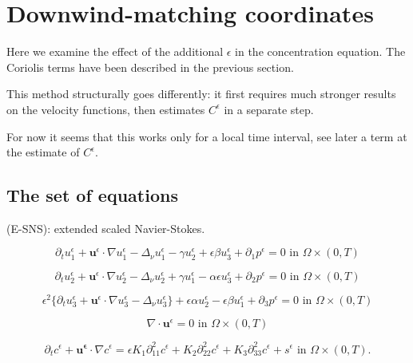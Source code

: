 \documentclass[11pt]{article}
\begin{document}
\section{Downwind-matching coordinates}

Here we examine the effect of the additional $\epsilon$ in the concentration equation. The Coriolis terms have been described in the previous section.

This method structurally goes differently: it first requires much stronger results on the velocity functions, then estimates $C^\epsilon$ in a separate step.

For now it seems that this works only for a local time interval, see later a term at the estimate of $C^\epsilon.$

  \subsection{The set of equations}

(E-SNS): extended scaled Navier-Stokes.

    \begin{equation} \label{ANSC1-dw}
    \partial_t u^\epsilon _1 + \mathbf{u}^\epsilon \cdot \nabla u^\epsilon _1 -\Delta_\nu u^\epsilon _1 -\gamma u_2^\epsilon + \epsilon \beta u_3^\epsilon + \partial_1 p^\epsilon = 0 \text{ in } \Omega \times (0,T)
    \end{equation}
    
    \begin{equation} \label{ANSC2-dw}
    \partial_t u_2^\epsilon + \mathbf{u}^\epsilon \cdot \nabla u_2^\epsilon -\Delta_\nu u_2^\epsilon + \gamma u_1^\epsilon  - \alpha \epsilon u^\epsilon_3 + \partial_2 p^\epsilon = 0 \text{ in } \Omega \times (0,T)
    \end{equation}
    
    \begin{equation} \label{ANSC3-dw}
    \epsilon^2 \{  \partial_t u_3^\epsilon + \mathbf{u}^\epsilon \cdot \nabla u_3^\epsilon -\Delta_\nu u_3^{\epsilon} \} + \epsilon \alpha u^\epsilon_2 - \epsilon \beta u_1^\epsilon + \partial_3 p^\epsilon = 0 \text{ in } \Omega \times (0,T)
    \end{equation}
    
    \begin{equation} \label{ANSC4-dw}
    \nabla \cdot \mathbf{u}^\epsilon= 0 \text{ in } \Omega \times (0,T)
    \end{equation}
    
    \begin{equation} \label{ANSC5-dw}
    \partial_t c^\epsilon + \mathbf{u^\epsilon} \cdot \nabla c^\epsilon = \epsilon K_1 \partial_{11} ^ 2 c^\epsilon + K_2 \partial_{22} ^ 2 c^\epsilon + K_3 \partial_{33} ^ 2 c^\epsilon + s^\epsilon \text{ in } \Omega \times (0,T).
    \end{equation}
    
\end{document}
